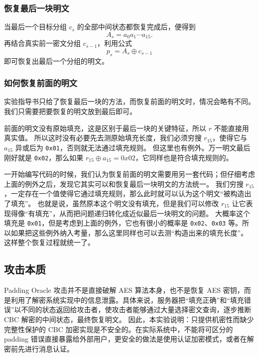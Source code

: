 \subsubsection{恢复最后一块明文}
当最后一个目标分组 $c_s$ 的全部中间状态都恢复完成后，便得到
\[
    A_s = a_0a_1\cdots a_{15}.
\]
再结合真实前一密文分组 $c_{s-1}$，利用公式
\[
    p_s = A_s \oplus c_{s-1}
\]
即可恢复出最后一个分组的明文。

\subsubsection{如何恢复前面的明文}
实验指导书只给了恢复最后一块的方法，而恢复前面的明文时，情况会略有不同。%
我们只需要把要恢复的明文放到最后即可。

前面的明文没有原始填充，这是区别于最后一块的关键特征，所以 \(r\) 不能直接用真实值。
所以这时没有必要先去测原始填充长度，我们必须穷搜 \(r_{15}\)，使得它与 \(a_{15}\) 异或后为 \texttt{0x01}，否则就无法通过填充规则。
但这里也有例外。万一明文最后刚好就是 \texttt{0x02}，那么如果 \(r_{15}\oplus a_{15} = 0x02\)，它同样也是符合填充规则的。

一开始编写代码的时候，我们认为恢复前面的明文需要用另一套代码；但仔细考虑上面的例外之后，发现它其实可以和恢复最后一块明文的方法统一。
我们穷搜 \(r_{15}\)，一定存在一个值使得它通过填充规则，那么此时就可以认为这个明文“被构造出了填充”。
也就是说，虽然原本这个明文没有填充，但是我们可以修改 \(r_{15}\) 让它表现得像“有填充”，从而把问题递归转化成近似最后一块明文的问题。
大概率这个填充是 \texttt{0x01}，但是考虑到上面的例外，它也有很小的概率是 \texttt{0x02}、\texttt{0x03} 等。所以如果把这些例外纳入考量，那么这里同样也可以去测“构造出来的填充长度”。
这样整个恢复过程就统一了。
\subsection{攻击本质}

Padding Oracle 攻击并不是直接破解 AES 算法本身，也不是恢复 AES 密钥，而是利用了解密系统实现中的信息泄露。具体来说，服务器把“填充正确”和“填充错误”以不同的状态返回给攻击者，使攻击者能够通过大量选择密文查询，逐步推断 CBC 解密的中间状态，最终恢复明文。
因此，本实验说明：只提供机密性而缺少完整性保护的 CBC 加密实现是不安全的。在实际系统中，不能将可区分的 padding 错误直接暴露给外部用户，更安全的做法是使用认证加密模式，或者在解密前先进行消息认证。
